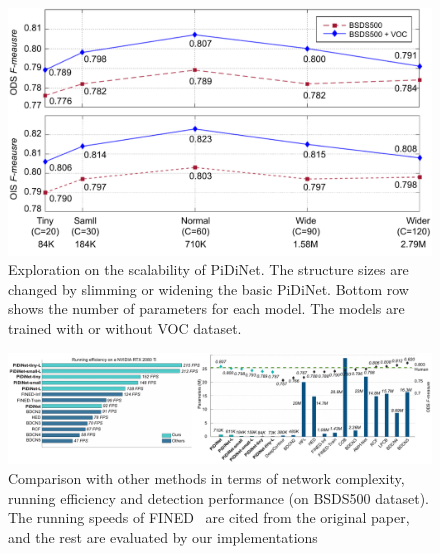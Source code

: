 \documentclass[10pt,twocolumn,letterpaper]{article}
\begin{document}
\begin{figure}[t!]
    \centering
    \includegraphics[width=1\linewidth]{images/ex_1.pdf}
    \caption{Exploration on the scalability of PiDiNet. The structure sizes are changed by slimming or widening the basic PiDiNet. Bottom row shows the number of parameters for each model. The models are trained with or without VOC dataset.}
    \label{fig:scalability}
\end{figure}

\begin{figure}[t!]
    \centering
    \includegraphics[width=1\linewidth]{images/fps_param.pdf}
    \caption{Comparison with other methods in terms of network complexity, running efficiency and detection performance (on BSDS500 dataset). The running speeds of FINED~\cite{wibisono2020fined} are cited from the original paper, and the rest are evaluated by our implementations}
    \label{fig:efficient}
\end{figure}
\end{document}
